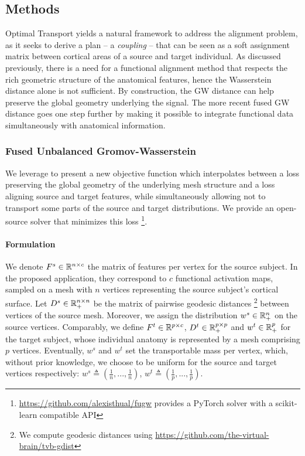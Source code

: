 \subsection{Methods}
\label{sec:methods}

Optimal Transport yields a natural framework to address the alignment problem,
as it seeks to derive a plan -- a \textit{coupling} -- that can be seen as a soft assignment matrix
between cortical areas of a source and target individual.
As discussed previously, there is a need for a functional alignment method that respects
the rich geometric structure of the anatomical features, hence the Wasserstein distance alone
is not sufficient.
By construction, the GW distance \citep{Memoli11,Memoli07}
can help preserve the global geometry underlying the signal.
The more recent fused GW distance \citep{Vayer19b} goes one step further by
making it possible to integrate functional data simultaneously with anatomical information.

\subsubsection{Fused Unbalanced Gromov-Wasserstein}

We leverage \citep{Vayer19b,Sejourne20} to present a new objective function which interpolates
between a loss preserving the global geometry of the underlying mesh structure and
a loss aligning source and target features, while simultaneously allowing not to transport
some parts of the source and target distributions. We provide an open-source solver
that minimizes this loss
\footnote{\href{https://github.com/alexisthual/fugw}{https://github.com/alexisthual/fugw}
provides a PyTorch \citep{NEURIPS2019_9015} solver with a scikit-learn \citep{scikit-learn}
compatible API}.

\paragraph{Formulation}
We denote $F^s \in \mathbb R^{n \times c}$ the matrix of features per vertex for the source subject.
In the proposed application, they correspond to $c$ functional activation maps,
sampled on a mesh with $n$ vertices representing the source subject's cortical surface.
Let $D^s \in \mathbb R^{n \times n}_+$ be the matrix of pairwise geodesic distances
\footnote{We compute geodesic distances using
\href{https://github.com/the-virtual-brain/tvb-gdist}{https://github.com/the-virtual-brain/tvb-gdist}}
between vertices of the source mesh.
Moreover, we assign the distribution $w^s \in \mathbb R^{n}_+$ on the source vertices.
Comparably, we define $F^t \in \mathbb R^{p \times c}$, $D^t \in \mathbb R^{p \times p}_+$ and
$w^t \in \mathbb R^{p}_+$ for the target subject, whose individual anatomy is represented
by a mesh comprising $p$ vertices.
Eventually, $w^s$ and $w^t$ set the transportable mass per vertex, which,
without prior knowledge, we choose to be uniform for the source and target vertices respectively:
$w^s \triangleq (\frac{1}{n}, ..., \frac{1}{n})$,
$w^t \triangleq (\frac{1}{p}, ..., \frac{1}{p})$.

